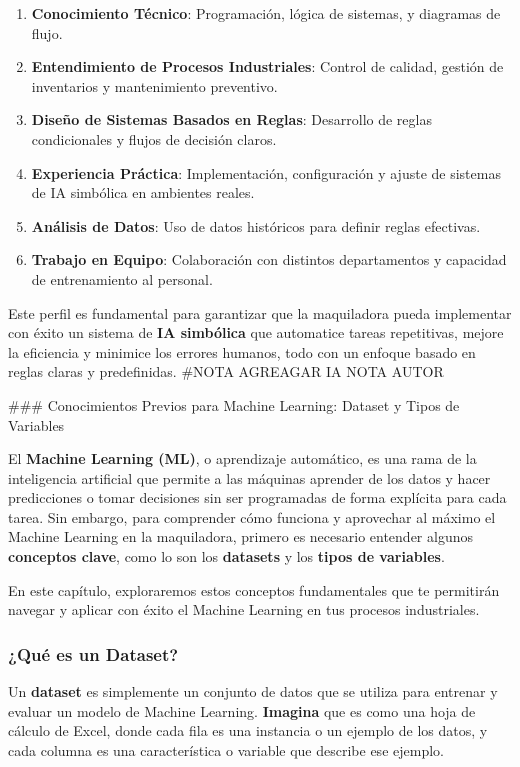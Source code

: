 \documentclass[
  10pt,
  letterpaper,
]{book}
\providecommand{\tightlist}{%
  \setlength{\itemsep}{0pt}\setlength{\parskip}{0pt}}\usepackage{longtable,booktabs,array}
\begin{document}
\begin{enumerate}
\def\labelenumi{\arabic{enumi}.}
\tightlist
\item
  \textbf{Conocimiento Técnico}: Programación, lógica de sistemas, y
  diagramas de flujo.
\item
  \textbf{Entendimiento de Procesos Industriales}: Control de calidad,
  gestión de inventarios y mantenimiento preventivo.
\item
  \textbf{Diseño de Sistemas Basados en Reglas}: Desarrollo de reglas
  condicionales y flujos de decisión claros.
\item
  \textbf{Experiencia Práctica}: Implementación, configuración y ajuste
  de sistemas de IA simbólica en ambientes reales.
\item
  \textbf{Análisis de Datos}: Uso de datos históricos para definir
  reglas efectivas.
\item
  \textbf{Trabajo en Equipo}: Colaboración con distintos departamentos y
  capacidad de entrenamiento al personal.
\end{enumerate}

Este perfil es fundamental para garantizar que la maquiladora pueda
implementar con éxito un sistema de \textbf{IA simbólica} que automatice
tareas repetitivas, mejore la eficiencia y minimice los errores humanos,
todo con un enfoque basado en reglas claras y predefinidas. \#NOTA
AGREAGAR IA NOTA AUTOR

\#\#\# Conocimientos Previos para Machine Learning: Dataset y Tipos de
Variables

El \textbf{Machine Learning (ML)}, o aprendizaje automático, es una rama
de la inteligencia artificial que permite a las máquinas aprender de los
datos y hacer predicciones o tomar decisiones sin ser programadas de
forma explícita para cada tarea. Sin embargo, para comprender cómo
funciona y aprovechar al máximo el Machine Learning en la maquiladora,
primero es necesario entender algunos \textbf{conceptos clave}, como lo
son los \textbf{datasets} y los \textbf{tipos de variables}.

En este capítulo, exploraremos estos conceptos fundamentales que te
permitirán navegar y aplicar con éxito el Machine Learning en tus
procesos industriales.

\subsubsection{¿Qué es un Dataset?}\label{quuxe9-es-un-dataset}

Un \textbf{dataset} es simplemente un conjunto de datos que se utiliza
para entrenar y evaluar un modelo de Machine Learning. \textbf{Imagina}
que es como una hoja de cálculo de Excel, donde cada fila es una
instancia o un ejemplo de los datos, y cada columna es una
característica o variable que describe ese ejemplo.
\end{document}
